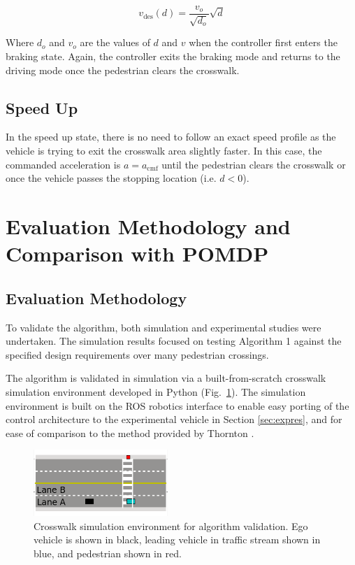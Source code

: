 \documentclass[letterpaper, 10 pt, conference]{ieeeconf} %
\begin{document}
\begin{equation}
v_\mathrm{des}(d) = \frac{v_o}{\sqrt{d_o}}\sqrt{d}
\end{equation}   

Where $d_o$ and $v_o$ are the values of $d$ and $v$ when the controller first enters the braking state. Again, the controller exits the braking mode and returns to the driving mode once the pedestrian clears the crosswalk. 

\subsection{Speed Up}

In the speed up state, there is no need to follow an exact speed profile as the vehicle is trying to exit the crosswalk area slightly faster. In this case, the commanded acceleration is $a = a_\mathrm{cmf}$ until the pedestrian clears the crosswalk or once the vehicle passes the stopping location (i.e. $d< 0$). 

\section{Evaluation Methodology and Comparison with POMDP}

\subsection{Evaluation Methodology}

To validate the algorithm, both simulation and experimental studies were undertaken. The simulation results focused on testing Algorithm 1 against the specified design requirements over many pedestrian crossings. 

The algorithm is validated in simulation via a built-from-scratch crosswalk simulation environment developed in Python (Fig.~\ref{fig:simFramework}). The simulation environment is built on the ROS robotics interface to enable easy porting of the control architecture to the experimental vehicle in Section \ref{sec:expres}, and for ease of comparison to the method provided by Thornton \cite{Thornton2018}.  

\begin{figure}
\centering
\includegraphics[width=2.0in]{simFramework.png}
\caption{Crosswalk simulation environment for algorithm validation. Ego vehicle is shown in black, leading vehicle in traffic stream shown in blue, and pedestrian shown in red.}
\label{fig:simFramework}
\end{figure}
\end{document}
